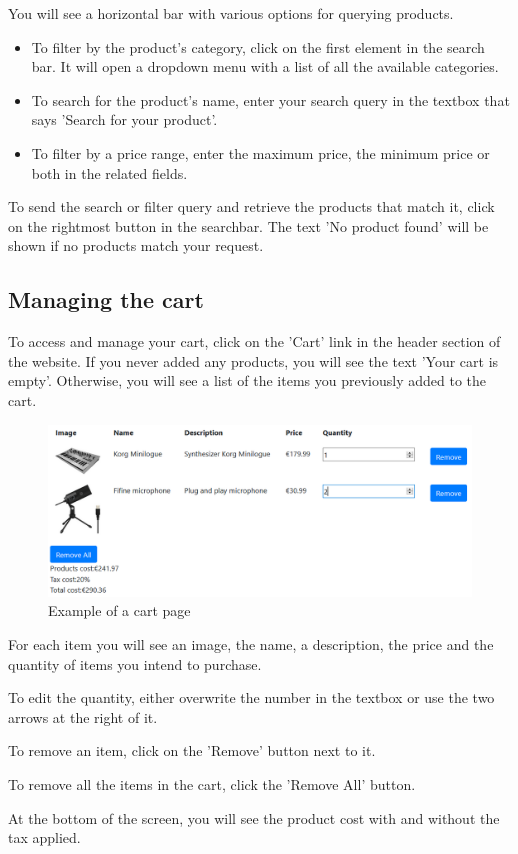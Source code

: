 You will see a horizontal bar with various options for querying products.

\begin{itemize}
\item To filter by the product's category, click on the first element in the search bar. It will open a dropdown menu with a list of all the available categories.
\item To search for the product's name, enter your search query in the textbox that says 'Search for your product'.
\item To filter by a price range, enter the maximum price, the minimum price or both in the related fields.
\end{itemize}

To send the search or filter query and retrieve the products that match it, click on the rightmost button in the searchbar. The text 'No product found' will be shown if no products match your request.

\subsection{Managing the cart}
To access and manage your cart, click on the 'Cart' link in the header section of the website. If you never added any products, you will see the text 'Your cart is empty'. Otherwise, you will see a list of the items you previously added to the cart.

\begin{figure}[H]
\centering
\includegraphics[scale=0.6]{res/Immagini/CartPage}
\caption{Example of a cart page}
\end{figure}

For each item you will see an image, the name, a description, the price and the quantity of items you intend to purchase.

To edit the quantity, either overwrite the number in the textbox or use the two arrows at the right of it. 

To remove an item, click on the 'Remove' button next to it. 

To remove all the items in the cart, click the 'Remove All' button.

At the bottom of the screen, you will see the product cost with and without the tax applied.